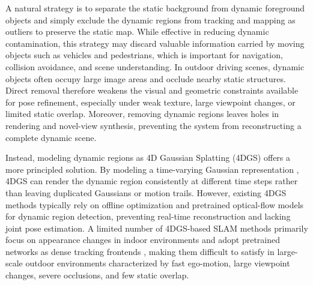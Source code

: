 \documentclass[letterpaper, 10 pt, conference]{ieeeconf}  %
\begin{document}
A natural strategy is to separate the static background from dynamic foreground objects and simply exclude the dynamic regions from tracking and mapping as outliers to preserve the static map.
While effective in reducing dynamic contamination, this strategy may discard valuable information carried by moving objects such as vehicles and pedestrians, which is important for navigation, collision avoidance, and scene understanding. In outdoor driving scenes, dynamic objects often occupy large image areas and occlude nearby static structures. Direct removal therefore weakens the visual and geometric constraints available for pose refinement, especially under weak texture, large viewpoint changes, or limited static overlap. Moreover, removing dynamic regions leaves holes in rendering and novel-view synthesis, preventing the system from reconstructing a complete dynamic scene. 

Instead, modeling dynamic regions as 4D Gaussian Splatting (4DGS) \cite{4dgs} offers a more principled solution. By modeling a time-varying Gaussian representation , 4DGS can render the dynamic region consistently at different time steps rather than leaving duplicated Gaussians or motion trails. 
However, existing 4DGS methods \cite{motion4d, desire-gs} typically rely on offline optimization and pretrained optical-flow models \cite{raft} for dynamic region detection, preventing real-time reconstruction and lacking joint pose estimation. A limited number of 4DGS-based SLAM methods \cite{4dgs-slam, wildgs-slam, flow4dgs-slam} primarily focus on appearance changes in indoor environments and adopt pretrained networks as dense tracking frontends \cite{dpvo,droid-slam}, making them difficult to satisfy in large-scale outdoor environments characterized by fast ego-motion, large viewpoint changes, severe occlusions, and few static overlap.
\end{document}
